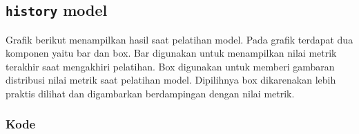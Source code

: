\documentclass[11pt]{article}
\begin{document}
    \begin{center}
    \end{center}
    { \hspace*{\fill} \\}
    
    \begin{center}
    \end{center}
    { \hspace*{\fill} \\}
    
    \begin{center}
    \end{center}
    { \hspace*{\fill} \\}
    
    \hypertarget{history-model}{%
\subsection{\texorpdfstring{\texttt{history}
model}{history model}}\label{history-model}}

Grafik berikut menampilkan hasil saat pelatihan model. Pada grafik
terdapat dua komponen yaitu bar dan box. Bar digunakan untuk menampilkan
nilai metrik terakhir saat mengakhiri pelatihan. Box digunakan untuk
memberi gambaran distribusi nilai metrik saat pelatihan model.
Dipilihnya box dikarenakan lebih praktis dilihat dan digambarkan
berdampingan dengan nilai metrik.

    \hypertarget{kode}{%
\subsubsection{Kode}\label{kode}}
\end{document}
